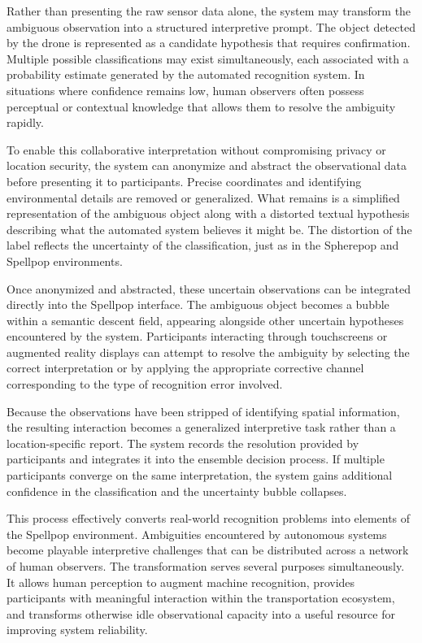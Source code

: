 \documentclass[11pt]{article}
\begin{document}
Rather than presenting the raw sensor data alone, the system may transform the ambiguous observation into a structured interpretive prompt. The object detected by the drone is represented as a candidate hypothesis that requires confirmation. Multiple possible classifications may exist simultaneously, each associated with a probability estimate generated by the automated recognition system. In situations where confidence remains low, human observers often possess perceptual or contextual knowledge that allows them to resolve the ambiguity rapidly.

To enable this collaborative interpretation without compromising privacy or location security, the system can anonymize and abstract the observational data before presenting it to participants. Precise coordinates and identifying environmental details are removed or generalized. What remains is a simplified representation of the ambiguous object along with a distorted textual hypothesis describing what the automated system believes it might be. The distortion of the label reflects the uncertainty of the classification, just as in the Spherepop and Spellpop environments.

Once anonymized and abstracted, these uncertain observations can be integrated directly into the Spellpop interface. The ambiguous object becomes a bubble within a semantic descent field, appearing alongside other uncertain hypotheses encountered by the system. Participants interacting through touchscreens or augmented reality displays can attempt to resolve the ambiguity by selecting the correct interpretation or by applying the appropriate corrective channel corresponding to the type of recognition error involved.

Because the observations have been stripped of identifying spatial information, the resulting interaction becomes a generalized interpretive task rather than a location-specific report. The system records the resolution provided by participants and integrates it into the ensemble decision process. If multiple participants converge on the same interpretation, the system gains additional confidence in the classification and the uncertainty bubble collapses.

This process effectively converts real-world recognition problems into elements of the Spellpop environment. Ambiguities encountered by autonomous systems become playable interpretive challenges that can be distributed across a network of human observers. The transformation serves several purposes simultaneously. It allows human perception to augment machine recognition, provides participants with meaningful interaction within the transportation ecosystem, and transforms otherwise idle observational capacity into a useful resource for improving system reliability.
\end{document}
